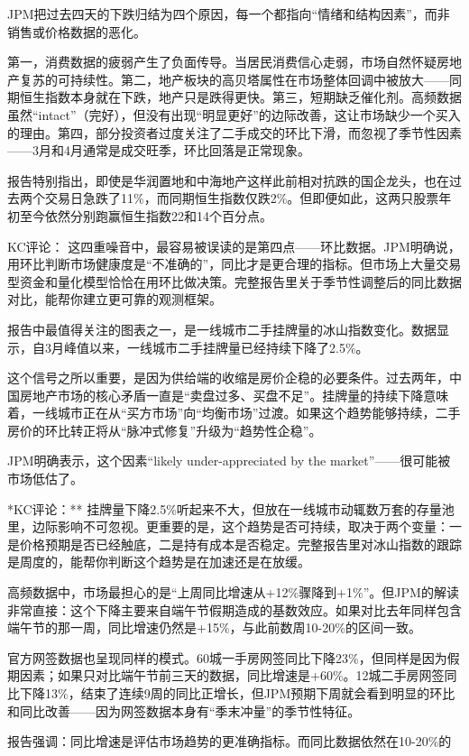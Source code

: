 \documentclass[11pt]{ctexart}
\begin{document}
JPM把过去四天的下跌归结为四个原因，每一个都指向“情绪和结构因素”，而非销售或价格数据的恶化。

第一，消费数据的疲弱产生了负面传导。当居民消费信心走弱，市场自然怀疑房地产复苏的可持续性。第二，地产板块的高贝塔属性在市场整体回调中被放大——同期恒生指数本身就在下跌，地产只是跌得更快。第三，短期缺乏催化剂。高频数据虽然“intact”（完好），但没有出现“明显更好”的边际改善，这让市场缺少一个买入的理由。第四，部分投资者过度关注了二手成交的环比下滑，而忽视了季节性因素——3月和4月通常是成交旺季，环比回落是正常现象。

报告特别指出，即使是华润置地和中海地产这样此前相对抗跌的国企龙头，也在过去两个交易日急跌了11\%，而同期恒生指数仅跌2\%。但即便如此，这两只股票年初至今依然分别跑赢恒生指数22和14个百分点。

KC评论： 这四重噪音中，最容易被误读的是第四点——环比数据。JPM明确说，用环比判断市场健康度是“不准确的”，同比才是更合理的指标。但市场上大量交易型资金和量化模型恰恰在用环比做决策。完整报告里关于季节性调整后的同比数据对比，能帮你建立更可靠的观测框架。

报告中最值得关注的图表之一，是一线城市二手挂牌量的冰山指数变化。数据显示，自3月峰值以来，一线城市二手挂牌量已经持续下降了2.5\%。

这个信号之所以重要，是因为供给端的收缩是房价企稳的必要条件。过去两年，中国房地产市场的核心矛盾一直是“卖盘过多、买盘不足”。挂牌量的持续下降意味着，一线城市正在从“买方市场”向“均衡市场”过渡。如果这个趋势能够持续，二手房价的环比转正将从“脉冲式修复”升级为“趋势性企稳”。

JPM明确表示，这个因素“likely under-appreciated by the market”——很可能被市场低估了。

*KC评论：** 挂牌量下降2.5\%听起来不大，但放在一线城市动辄数万套的存量池里，边际影响不可忽视。更重要的是，这个趋势是否可持续，取决于两个变量：一是价格预期是否已经触底，二是持有成本是否稳定。完整报告里对冰山指数的跟踪是周度的，能帮你判断这个趋势是在加速还是在放缓。

高频数据中，市场最担心的是“上周同比增速从+12\%骤降到+1\%”。但JPM的解读非常直接：这个下降主要来自端午节假期造成的基数效应。如果对比去年同样包含端午节的那一周，同比增速仍然是+15\%，与此前数周10-20\%的区间一致。

官方网签数据也呈现同样的模式。60城一手房网签同比下降23\%，但同样是因为假期因素；如果只对比端午节前三天的数据，同比增速是+60\%。12城二手房网签同比下降13\%，结束了连续9周的同比正增长，但JPM预期下周就会看到明显的环比和同比改善——因为网签数据本身有“季末冲量”的季节性特征。

报告强调：同比增速是评估市场趋势的更准确指标。而同比数据依然在10-20\%的
\end{document}
